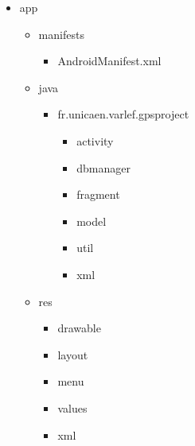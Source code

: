 \begin{multicols}{2}
\begin{itemize}
  \item app
     \begin{itemize}
       \item manifests
       \begin{itemize}
         \item AndroidManifest.xml
       \end{itemize}
       \item java
       \begin{itemize}
         \item fr.unicaen.varlef.gpsproject
         \begin{itemize}
           \item activity
           \item dbmanager
           \item fragment
           \item model
           \item util
           \item xml
         \end{itemize}
       \end{itemize}
       \item res
       \begin{itemize}
           \item drawable
           \item layout
           \item menu
           \item values
           \item xml
         \end{itemize}
     \end{itemize}
\end{itemize}\bigskip

\end{multicols}




